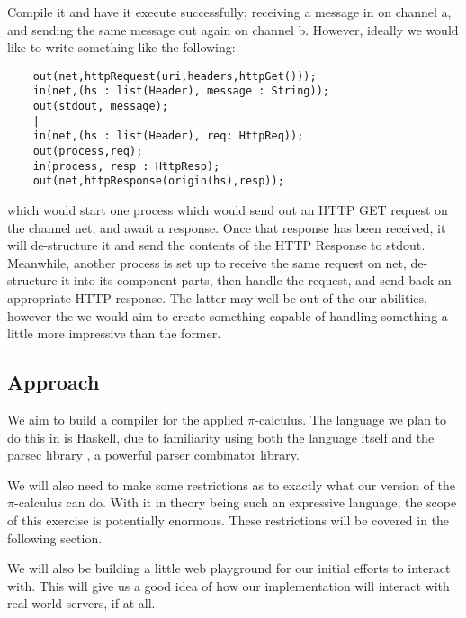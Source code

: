 Compile it and have it execute successfully; receiving a message in on channel a, and sending the same message out again on channel b. However, ideally we would like to write something like the following:
\begin{verbatim}
    out(net,httpRequest(uri,headers,httpGet()));
    in(net,(hs : list(Header), message : String));
    out(stdout, message);
    |
    in(net,(hs : list(Header), req: HttpReq));
    out(process,req);
    in(process, resp : HttpResp);
    out(net,httpResponse(origin(hs),resp));
\end{verbatim}

which would start one process which would send out an HTTP GET request on the channel net, and await a response. Once that response has been received, it will de-structure it and send the contents of the HTTP Response to stdout. Meanwhile, another process is set up to receive the same request on net, de-structure it into its component parts, then handle the request, and send back an appropriate HTTP response. The latter may well be out of the our abilities, however the we would aim to create something capable of handling something a little more impressive than the former.

\subsection{Approach}

We aim to build a compiler for the applied $\pi$-calculus. The language we plan to do this in is Haskell, due to familiarity using both the language itself and the parsec library \cite{lm01}, a powerful parser combinator library. 

We will also need to make some restrictions as to exactly what our version of the $\pi$-calculus can do. With it in theory being such an expressive language, the scope of this exercise is potentially enormous. These restrictions will be covered in the following section.

We will also be building a little web playground for our initial efforts to interact with. This will give us a good idea of how our implementation will interact with real world servers, if at all. 



